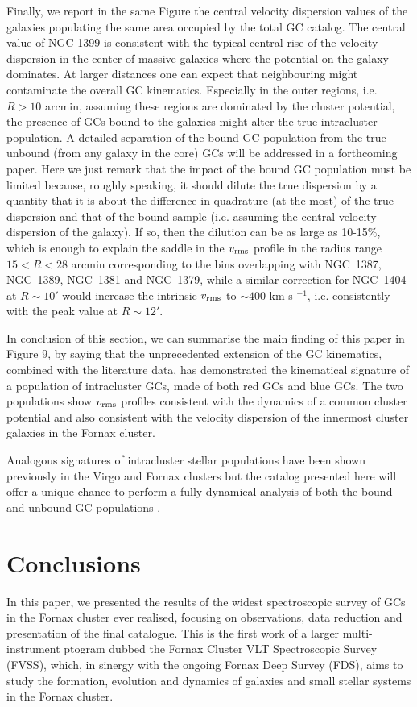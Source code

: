\documentclass[useAMS,usenatbib]{mn2e}
\begin{document}
Finally, we report in the same Figure the central velocity dispersion values of 
the galaxies populating the same area occupied by the total GC catalog. The 
central value of NGC 1399 is consistent with the typical central rise of the 
velocity dispersion in the center of massive galaxies where the potential on 
the galaxy dominates. At larger distances one can expect that neighbouring 
might contaminate the overall GC kinematics. Especially in the outer regions, 
i.e. $R>10$ arcmin, assuming these regions are dominated by the cluster 
potential, the presence of GCs bound to the galaxies might alter the true  
intracluster population. A detailed separation of the bound GC population from 
the true unbound (from any galaxy in the core) GCs will be addressed in a 
forthcoming paper. Here we just remark that the impact of the bound GC 
population must be limited because, roughly speaking, it should dilute the true 
dispersion by a quantity that it is about the difference in quadrature (at the 
most) of the true dispersion and that of the bound sample (i.e. assuming the 
central velocity dispersion of the galaxy). If so, then the dilution can be as 
large as 10-15$\%$, which is enough to explain the saddle in the  $v_{\rm rms}$ 
profile in the radius range $15<R<28$ arcmin corresponding to the bins 
overlapping with NGC~1387, NGC~1389, NGC~1381 and NGC~1379, while a similar 
correction for NGC~1404 at $R\sim10'$ would increase the intrinsic $v_{\rm 
rms}$ to $\sim400$ km s $^{-1}$, i.e. consistently with the peak value at 
$R\sim12'$.

In conclusion of this section, we can summarise the main finding of this paper 
in Figure 9, by saying that the unprecedented extension of the GC kinematics, 
combined with the literature data, has demonstrated the kinematical signature 
of a population of intracluster GCs, made of both red GCs and blue GCs. The two 
populations show $v_{\rm rms}$ profiles consistent with the dynamics of a 
common cluster potential and also consistent with the velocity dispersion of 
the innermost cluster galaxies in the Fornax cluster. 

Analogous signatures of intracluster stellar populations have been shown 
previously in the Virgo and Fornax clusters \citep[see e.g., ][]{Arnaboldi04, 
Longobardi15, Paolillo02} but the catalog presented here will offer a unique 
chance to perform a fully dynamical analysis of both the bound and unbound GC 
populations \citep{DAbrusco16}.

\section{Conclusions}
\label{sec:conclusions}
In this paper, we presented the results of the widest spectroscopic survey of 
GCs in the Fornax cluster ever realised, focusing on observations, data 
reduction and presentation of the final catalogue. This is the first work of a 
larger multi-instrument ptogram dubbed the Fornax Cluster VLT Spectroscopic 
Survey (FVSS), which, in sinergy with the ongoing Fornax Deep Survey (FDS), 
aims to study the formation, evolution and dynamics of galaxies and small 
stellar systems in the Fornax cluster.
\end{document}
